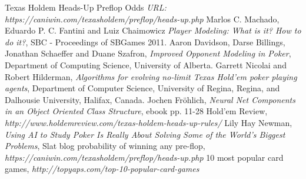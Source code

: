 \begin{thebibliography}{100} 
 Texas Holdem Heads-Up Preflop Odds 
\emph{URL: https://caniwin.com/texasholdem/preflop/heads-up.php}
 Marlos C. Machado, Eduardo P. C. Fantini and Luiz Chaimowicz \emph{Player Modeling: What is it? How to do it?}, SBC - Proceedings of SBGames 2011.
 Aaron Davidson, Darse Billings, Jonathan Schaeffer and Duane Szafron, \emph{Improved Opponent Modeling in Poker},
Department of Computing Science, University of Alberta.
 Garrett Nicolai and Robert Hilderman, \emph{Algorithms for evolving no-limit Texas Hold'em poker playing agents}, Department of Computer Science, University of Regina, Regina, and Dalhousie University, Halifax, Canada.
 Jochen Fröhlich, \emph {Neural Net Components in an Object Oriented Class Structure}, 
ebook pp. 11-28
 Hold'em Review, \emph {http://www.holdemreview.com/texas-holdem-heads-up-rules/}
 Lily Hay Newman, \emph{Using AI to Study Poker Is Really About Solving Some of the World’s Biggest Problems}, 
Slat blog
 probability of winning any pre-flop, \emph {https://caniwin.com/texasholdem/preflop/heads-up.php}
 10 most popular card games, \emph {http://topyaps.com/top-10-popular-card-games}
\end{thebibliography}